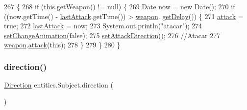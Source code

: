 \begin{DoxyCode}
267                          \{
268         \textcolor{keywordflow}{if} (this.\mbox{\hyperlink{classentities_1_1_subject_a83e9ae12f3fc398ba7e9b7381e7b23b2}{getWeapon}}() != null) \{
269             Date now = \textcolor{keyword}{new} Date();
270             \textcolor{keywordflow}{if} ((now.getTime() - \mbox{\hyperlink{classentities_1_1_subject_a2ca3b455a7b8de072990c4349a5dc5ca}{lastAttack}}.getTime()) > \mbox{\hyperlink{classentities_1_1_subject_abb65e5fdf2a2b62efa2c9b1368c83f15}{weapon}}.
      \mbox{\hyperlink{classitems_1_1weapons_1_1_weapon_acff36703dc4c95e39a445288d3899980}{getDelay}}()) \{
271                 \mbox{\hyperlink{classentities_1_1_subject_a97663ba9e9a8708bf9affe4d9bf8de65}{attack}} = \textcolor{keyword}{true};
272                 \mbox{\hyperlink{classentities_1_1_subject_a2ca3b455a7b8de072990c4349a5dc5ca}{lastAttack}} = now;
273                 System.out.println(\textcolor{stringliteral}{"atacar"});
274                 \mbox{\hyperlink{classentities_1_1_animated_sprite_entity_a8732d4ec11ec60bf0a1f91811f16b67b}{setChangeAnimation}}(\textcolor{keyword}{false});
275                 \mbox{\hyperlink{classentities_1_1_subject_afca29e70bf8dead65f5b7cceec65a513}{setAttackDirection}}();
276                 \textcolor{comment}{//Atacar}
277                 \mbox{\hyperlink{classentities_1_1_subject_abb65e5fdf2a2b62efa2c9b1368c83f15}{weapon}}.\mbox{\hyperlink{classitems_1_1weapons_1_1_weapon_a2d097d82844c1426c09cf26d2f5a1b94}{attack}}(\textcolor{keyword}{this});
278             \}
279         \}
280     \}
\end{DoxyCode}
\mbox{\label{classentities_1_1_subject_aba8c53089bb93c35ce8359d97cf99bd6}} 
\subsubsection{\texorpdfstring{direction()}{direction()}}
{\footnotesize\ttfamily \mbox{\hyperlink{enumentities_1_1_direction}{Direction}} entities.\+Subject.\+direction (\begin{DoxyParamCaption}{ }\end{DoxyParamCaption})\hspace{0.3cm}{\ttfamily [inline]}}


